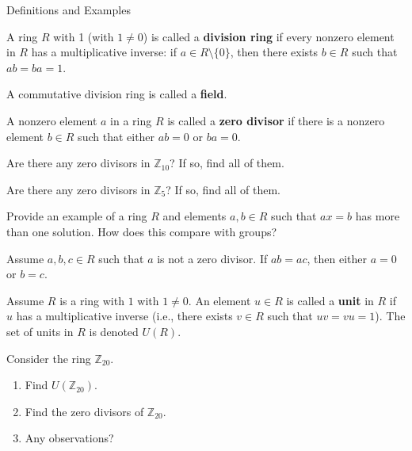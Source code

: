 \begin{section}{Definitions and Examples}
\begin{definition}
A ring $R$ with 1 (with $1\neq 0$) is called a \textbf{division ring} if every nonzero element in $R$ has a multiplicative inverse: if $a\in R\setminus\{0\}$, then there exists $b\in R$ such that $ab=ba=1$.
\end{definition}

\begin{definition}
A commutative division ring is called a \textbf{field}.
\end{definition}

\begin{definition}
A nonzero element $a$ in a ring $R$ is called a \textbf{zero divisor} if there is a nonzero element $b\in R$ such that either $ab=0$ or $ba=0$.
\end{definition}

\begin{problem}
Are there any zero divisors in $\mathbb{Z}_{10}$?  If so, find all of them.
\end{problem}

\begin{problem}
Are there any zero divisors in $\mathbb{Z}_5$?  If so, find all of them.
\end{problem}

\begin{problem}
Provide an example of a ring $R$ and elements $a,b\in R$ such that $ax=b$ has more than one solution.  How does this compare with groups?
\end{problem}

\begin{theorem}\label{thm:RingCancellation}
Assume $a,b,c\in R$ such that $a$ is not a zero divisor.  If $ab=ac$, then either $a=0$ or $b=c$.
\end{theorem}

\begin{definition}
Assume $R$ is a ring with $1$ with $1\neq 0$. An element $u\in R$ is called a \textbf{unit} in $R$ if $u$ has a multiplicative inverse (i.e., there exists $v\in R$ such that $uv=vu=1$).  The set of units in $R$ is denoted $U(R)$.
\end{definition}

\begin{problem}
Consider the ring $\mathbb{Z}_{20}$.
\begin{enumerate}[label=\textrm{(\alph*)}]
\item Find $U(\mathbb{Z}_{20})$.
\item Find the zero divisors of $\mathbb{Z}_{20}$.
\item Any observations?
\end{enumerate}
\end{problem}


\end{section}
